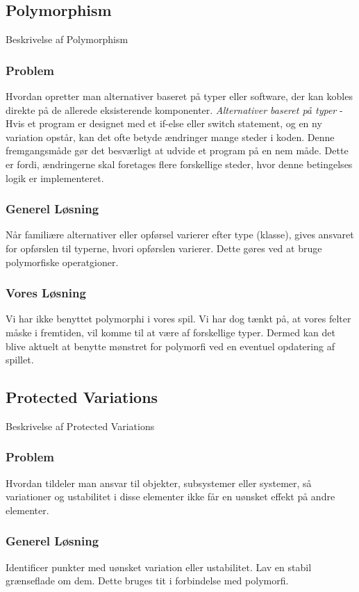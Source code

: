 \subsection{Polymorphism}
Beskrivelse af Polymorphism
\subsubsection*{Problem}
Hvordan opretter man alternativer baseret på typer eller software, der kan kobles direkte på de allerede eksisterende komponenter.
\textit{Alternativer baseret på typer} - Hvis et program er designet med et if-else eller switch statement, og en ny variation opstår, kan det ofte betyde ændringer mange steder i koden. Denne fremgangsmåde gør det besværligt at udvide et program på en nem måde. Dette er fordi, ændringerne skal foretages flere forskellige steder, hvor denne betingelses logik er implementeret.
\subsubsection*{Generel Løsning}
Når familiære alternativer eller opførsel varierer efter type (klasse), gives ansvaret for opførslen til typerne, hvori opførslen varierer. Dette gøres ved at bruge polymorfiske operatgioner.
\subsubsection*{Vores Løsning}
Vi har ikke benyttet polymorphi i vores spil. Vi har dog tænkt på, at vores felter måske i fremtiden, vil komme til at være af forskellige typer. Dermed kan det blive aktuelt at benytte mønstret for polymorfi ved en eventuel opdatering af spillet.
\subsection{Protected Variations}
Beskrivelse af Protected Variations
\subsubsection*{Problem}
Hvordan tildeler man ansvar til objekter, subsystemer eller systemer, så variationer og ustabilitet i disse elementer ikke får en uønsket effekt på andre elementer.
\subsubsection*{Generel Løsning}
Identificer punkter med uønsket variation eller ustabilitet. Lav en stabil grænseflade om dem. Dette bruges tit i forbindelse med polymorfi.
